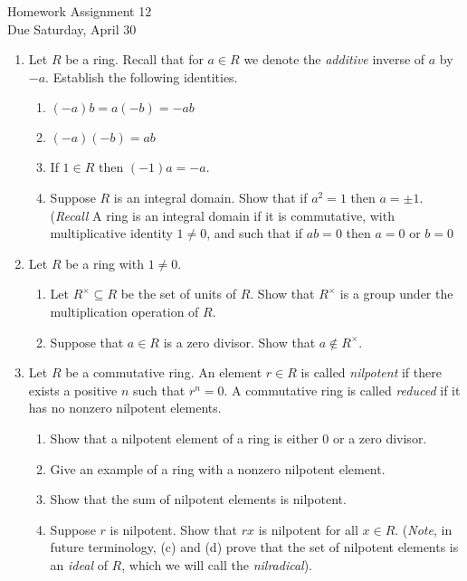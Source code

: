 \documentclass[11pt]{article}
\begin{document}
\begin{center}
\Large {Homework Assignment 12}\\
\small {Due Saturday, April 30}
\end{center}
\begin{enumerate}
  \item{
  Let $R$ be a ring.  Recall that for $a\in R$ we denote the \textit{additive} inverse of $a$ by $-a$.  Establish the following identities.
  \begin{enumerate}
    \item{$(-a)b = a(-b) = -ab$}
    \item{$(-a)(-b) = ab$}
    \item{If $1\in R$ then $(-1)a = -a$.}
    \item{Suppose $R$ is an integral domain.  Show that if $a^2=1$ then $a=\pm1$.  (\textit{Recall} A ring is an integral domain if it is commutative, with multiplicative identity $1\not=0$, and such that if $ab=0$ then $a=0$ or $b=0$}
  \end{enumerate}
  }
  \item{
  Let $R$ be a ring with $1\not=0$.
  \begin{enumerate}
    \item{
    Let $R^\times\subseteq R$ be the set of units of $R$.  Show that $R^\times$ is a group under the multiplication operation of $R$.
    }
    \item{
    Suppose that $a\in R$ is a zero divisor.  Show that $a\notin R^\times$.
    }
    \end{enumerate}
    }
  \item{
  Let $R$ be a commutative ring.  An element $r\in R$ is called \textit{nilpotent} if there exists a positive $n$ such that $r^n=0$.  A commutative ring is called \textit{reduced} if it has no nonzero nilpotent elements.
  \begin{enumerate}
    \item{
    Show that a nilpotent element of a ring is either 0 or a zero divisor.
    }
    \item{
    Give an example of a ring with a nonzero nilpotent element.
    }
    \item{
    Show that the sum of nilpotent elements is nilpotent.
    }
    \item{
    Suppose $r$ is nilpotent.  Show that $rx$ is nilpotent for all $x\in R$.  (\textit{Note}, in future terminology, (c) and (d) prove that the set of nilpotent elements is an \textit{ideal} of $R$, which we will call the \textit{nilradical}).
}
\end{enumerate}}
\end{enumerate}
\end{document}

